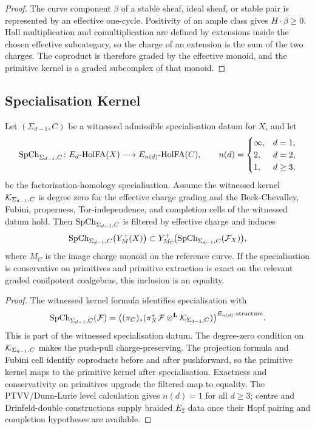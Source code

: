 \begin{proof}
The curve component $\beta$ of a stable sheaf, ideal sheaf, or stable
pair is represented by an effective one-cycle. Positivity of an ample
class gives $H\cdot\beta\geq0$. Hall multiplication and comultiplication
are defined by extensions inside the chosen effective subcategory, so
the charge of an extension is the sum of the two charges. The coproduct
is therefore graded by the effective monoid, and the primitive kernel is
a graded subcomplex of that monoid.
\end{proof}

\subsection{Specialisation Kernel}
\label{wn:subsec:sp-transports-positivity}

\begin{theorem}
\label{wn:thm:Sp-preserves-pos}
Let $(\Sigma_{d-1},C)$ be a witnessed admissible specialisation datum
for $X$, and let
\[
 \mathrm{SpCh}_{\Sigma_{d-1},C}\colon E_d\text{-}\mathrm{HolFA}(X)\longrightarrow
 E_{n(d)}\text{-}\mathrm{HolFA}(C),
 \qquad
 n(d)=
 \begin{cases}
 \infty,&d=1,\\
 2,&d=2,\\
 1,&d\geq3,
 \end{cases}
\]
be the factorisation-homology specialisation. Assume the witnessed kernel
$\mathcal{K}_{\Sigma_{d-1},C}$ is degree zero for the effective charge
grading and the Beck-Chevalley, Fubini, properness, Tor-independence,
and completion cells of the witnessed datum hold. Then
$\mathrm{SpCh}_{\Sigma_{d-1},C}$ is filtered by effective charge and induces
\[
 \mathrm{SpCh}_{\Sigma_{d-1},C}\bigl(Y^{+}_M(X)\bigr)
 \subset
 Y^{+}_{M_C}\!\bigl(\mathrm{SpCh}_{\Sigma_{d-1},C}(\mathcal{F}_X)\bigr),
\]
where $M_C$ is the image charge monoid on the reference curve. If the
specialisation is conservative on primitives and primitive extraction is
exact on the relevant graded conilpotent coalgebras, this inclusion is
an equality.
\end{theorem}

\begin{proof}
The witnessed kernel formula identifies specialisation with
\[
 \mathrm{SpCh}_{\Sigma_{d-1},C}(\mathcal{F})
 =
 \bigl((\pi_C)_*(\pi_X^*\mathcal{F}\otimes^{\mathbf L}
 \mathcal{K}_{\Sigma_{d-1},C})\bigr)^{E_{n(d)}\text{-}\mathrm{structure}}.
\]
This is part of the witnessed specialisation datum. The degree-zero
condition on $\mathcal{K}_{\Sigma_{d-1},C}$ makes the push-pull
charge-preserving. The projection formula and Fubini cell identify
coproducts before and after pushforward, so the primitive kernel maps to
the primitive kernel after specialisation. Exactness and conservativity
on primitives upgrade the filtered map to equality. The
PTVV/Dunn-Lurie level calculation gives $n(d)=1$ for all $d\geq3$;
centre and Drinfeld-double constructions supply braided $E_2$ data once
their Hopf pairing and completion hypotheses are available.
\end{proof}

